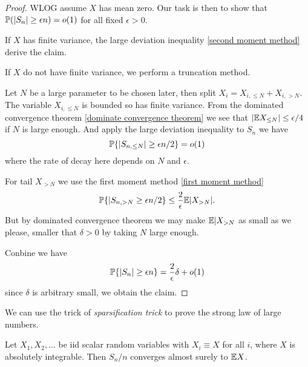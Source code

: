 \begin{proof}
    WLOG assume $X$ has mean zero. Our task is then to show that $\mathbb{P} (|S_n| \geq \epsilon n)=o(1)$ for all fixed $\epsilon > 0$.

    If $X$ has finite variance, the large deviation inequality \ref{second moment method} derive the claim.

    If $X$ do not have finite variance, we perform a truncation method. 

    Let $N$ be a large parameter to be chosen later, then split $X_i = X_{i,\leq N}+X_{i,>N}$. The variable $X_{i,\leq N}$ is bounded so has finite variance. 
    From the dominated convergence theorem \ref{dominate convergence theorem} we see that $|\mathbb{E} X_{\leq N}| \leq \epsilon/4$ if $N$ is large enough. And apply the large deviation inequality to $S_n$ we have
    \begin{equation*}
        \mathbb{P}\{|S_{n,\leq N}| \geq \epsilon n/2 \} =o(1)
    \end{equation*}
    where the rate of decay here depends on $N$ and $\epsilon$.

    For tail $X_{>N}$ we use the first moment method \ref{first moment method}
    \begin{equation*}
        \mathbb{P} \{|S_{n,>N} \geq \epsilon n /2 \} \leq \frac{2}{\epsilon} \mathbb{E} |X_{>N}|.
    \end{equation*}
    But by dominated convergence theorem we may make $\mathbb{E}|X_{>N}$ as small as we please, smaller that $\delta>0$ by taking $N$ large enough.

    Conbine we have 
    \begin{equation*}
        \mathbb{P} \{|S_n|\geq \epsilon n \} = \frac{2}{\epsilon} \delta +o(1)
    \end{equation*}
    since $\delta$ is arbitrary small, we obtain the claim.
\end{proof}

We can use the trick of \textit{sparsification trick} to prove the strong law of large numbers. 

\begin{theorem}
    Let $X_1,X_2,\dots$ be iid scalar random variables with $X_i \equiv X$ for all $i$, where $X$ is absolutely integrable. Then $S_n/n$ converges almost surely to $\mathbb{E} X$. 
\end{theorem}

